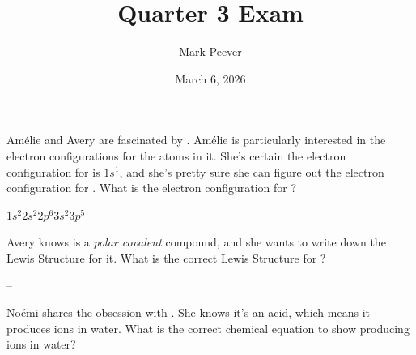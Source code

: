 \documentclass[11pt,addpoints]{exam}   	%
\title{Quarter 3 Exam}
\author{Mark Peever}
\date{March 6, 2026}							%
\begin{document}
\maketitle

\pointsinrightmargin

\begin{center}
\end{center}
\vspace{0.1in}
\vspace{0.2in}

\begin{questions}

\question[5] Am\'elie and Avery are fascinated by . Am\'elie is particularly interested in the electron configurations for the atoms in it. 
She's certain the electron configuration for  is $1s^{1}$, and she's pretty sure she can figure out the electron configuration for .
What is the electron configuration for ?

\begin{solution}
$1s^{2} 2s^{2} 2p^{6} 3s^{2} 3p^{5}$
\end{solution}

\vspace{0.2in}


\question[5] Avery knows  is a \emph{polar covalent} compound, and she wants to write down the Lewis Structure for it.
What is the correct Lewis Structure for ?

\begin{solution}
\hspace{-0.5em}--\hspace{-0.75em}
\end{solution}

\vspace{0.2in}

\question[5] No\'emi shares the obsession with . She knows it's an acid, which means it produces  ions in water.
What is the correct chemical equation to show  producing  ions in water?

\begin{solution}
\end{solution}


\end{questions}
\end{document}
